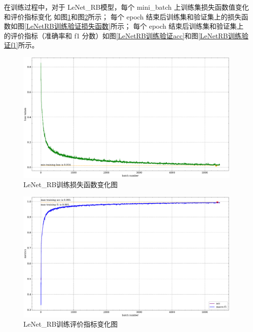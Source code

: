 \documentclass[supercite]{Experimental_Report}
\theoremstyle{definition}
\begin{document}
在训练过程中，对于 LeNet\_RB模型，每个 mini\_batch 上训练集损失函数值变化和评价指标变化
如图\ref{LeNetRB训练损失函数batch}和图\ref{LeNetRB训练评价指标batch}所示；
每个 epoch 结束后训练集和验证集上的损失函数如图\ref{LeNetRB训练验证损失函数}所示；
每个 epoch 结束后训练集和验证集上的评价指标（准确率和 f1 分数）如图\ref{LeNetRB训练验证acc}和图\ref{LeNetRB训练验证f1}所示。
\begin{figure}[H]
	\begin{center}
		\includegraphics[scale=0.45]{../images/LeNetRB训练损失函数batch.pdf}
		\caption{LeNet\_RB训练损失函数变化图}
		\label{LeNetRB训练损失函数batch}
	\end{center}
\end{figure}
\begin{figure}[H]
	\begin{center}
		\includegraphics[scale=0.45]{../images/LeNetRB训练评价指标batch.pdf}
		\caption{LeNet\_RB训练评价指标变化图}
		\label{LeNetRB训练评价指标batch}
	\end{center}
\end{figure}
\end{document}
